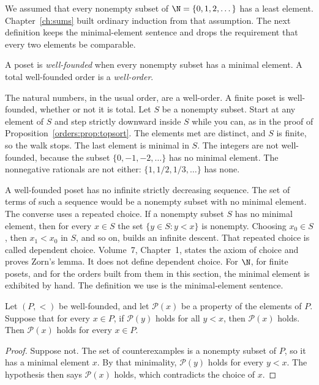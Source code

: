 We assumed that every nonempty subset of $\N=\{0,1,2,\dots\}$ has a least element. Chapter~\ref{ch:sums} built ordinary induction from that assumption. The next definition keeps the minimal-element sentence and drops the requirement that every two elements be comparable.

\begin{definition}\label{orders:def:wf}
A poset is \emph{well-founded} when every nonempty subset has a minimal element. A total well-founded order is a \emph{well-order}.
\end{definition}

The natural numbers, in the usual order, are a well-order. A finite poset is well-founded, whether or not it is total. Let $S$ be a nonempty subset. Start at any element of $S$ and step strictly downward inside $S$ while you can, as in the proof of Proposition~\ref{orders:prop:topsort}. The elements met are distinct, and $S$ is finite, so the walk stops. The last element is minimal in $S$. The integers are not well-founded, because the subset $\{0,-1,-2,\dots\}$ has no minimal element. The nonnegative rationals are not either: $\{1,1/2,1/3,\dots\}$ has none.

A well-founded poset has no infinite strictly decreasing sequence. The set of terms of such a sequence would be a nonempty subset with no minimal element. The converse uses a repeated choice. If a nonempty subset $S$ has no minimal element, then for every $x\in S$ the set $\{y\in S:y<x\}$ is nonempty. Choosing $x_0\in S$, then $x_1<x_0$ in $S$, and so on, builds an infinite descent. That repeated choice is called dependent choice. Volume~7, Chapter~1, states the axiom of choice and proves Zorn's lemma. It does not define dependent choice. For $\N$, for finite posets, and for the orders built from them in this section, the minimal element is exhibited by hand. The definition we use is the minimal-element sentence.

\begin{theorem}\label{orders:thm:wfind}
Let $(P,<)$ be well-founded, and let $\mathcal P(x)$ be a property of the elements of $P$. Suppose that for every $x\in P$, if $\mathcal P(y)$ holds for all $y<x$, then $\mathcal P(x)$ holds. Then $\mathcal P(x)$ holds for every $x\in P$.
\end{theorem}
\begin{proof}
Suppose not. The set of counterexamples is a nonempty subset of $P$, so it has a minimal element $x$. By that minimality, $\mathcal P(y)$ holds for every $y<x$. The hypothesis then says $\mathcal P(x)$ holds, which contradicts the choice of $x$.
\end{proof}

